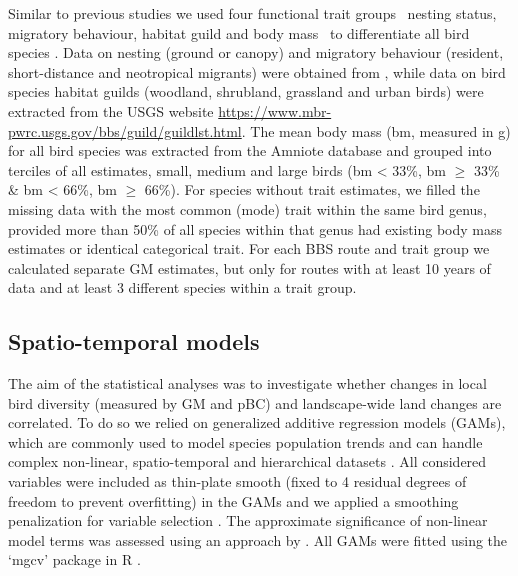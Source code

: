Similar to previous studies we used four functional trait groups \textendash\ nesting status, migratory behaviour, habitat guild and body mass \textendash\ to differentiate all bird species \citep{Schipper2016,Barnagaud2017}. Data on nesting (ground or canopy) and migratory behaviour (resident, short-distance and neotropical migrants) were obtained from \cite{Albright2011}, while data on bird species habitat guilds (\eg woodland, shrubland, grassland and urban birds) were extracted from the USGS website \href{https://www.mbr-pwrc.usgs.gov/bbs/guild/guildlst.html}{https://www.mbr-pwrc.usgs.gov/bbs/guild/guildlst.html}. The mean body mass (bm, measured in g) for all bird species was extracted from the Amniote database \citep{Myhrvold2015} and grouped into terciles of all estimates, \eg small, medium and large birds (bm < 33\%, bm $\geq$ 33\% \& bm < 66\%, bm $\geq$ 66\%). For species without trait estimates, we filled the missing data with the most common (mode) trait within the same bird genus, provided more than 50\% of all species within that genus had existing body mass estimates or identical categorical trait. For each BBS route and trait group we calculated separate GM estimates, but only for routes with at least 10 years of data and at least 3 different species within a trait group.

\subsection{Spatio-temporal models}
\label{C05_0205}

The aim of the statistical analyses was to investigate whether changes in local bird diversity (measured by GM and pBC) and landscape-wide land changes are correlated. To do so we relied on generalized additive regression models (GAMs), which are commonly used to model species population trends \citep{Fewster2000} and can handle complex non-linear, spatio-temporal and hierarchical datasets \citep{Kneib2009,Wood2011}. All considered variables were included as thin-plate smooth (fixed to 4 residual degrees of freedom to prevent overfitting) in the GAMs and we applied a smoothing penalization for variable selection \citep[mgcv parameter: select = TRUE]{Wood2008}. The approximate significance of non-linear model terms was assessed using an approach by \cite{Wood2013}. All GAMs were fitted using the ‘mgcv’ package \citep[ver. 1.8-24]{Wood2011} in R \citep[ver. 3.5.0]{RTeam2014}.

